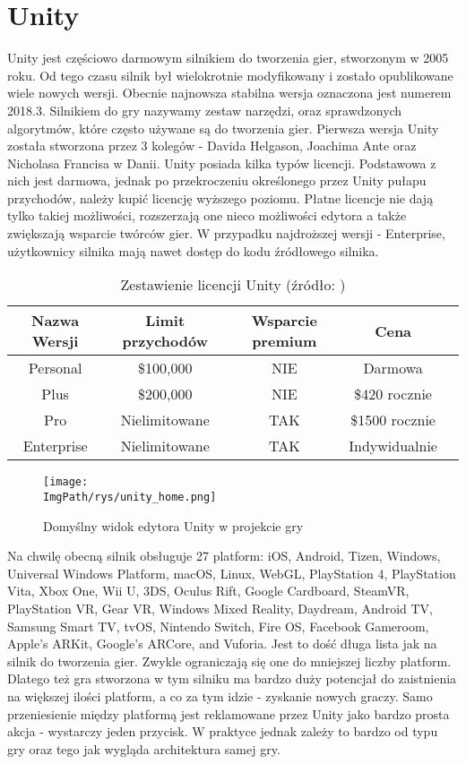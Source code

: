 \documentclass[a4paper,12pt,twoside,openany]{report}
\newcommand{\ImgPath}{.}
\begin{document}
\section{Unity}
Unity jest częściowo darmowym silnikiem do tworzenia gier, stworzonym w 2005 roku. Od tego czasu silnik był wielokrotnie modyfikowany i zostało opublikowane wiele nowych wersji. Obecnie najnowsza stabilna wersja oznaczona jest numerem 2018.3\cite{unity_wiki}. Silnikiem do gry nazywamy zestaw narzędzi, oraz sprawdzonych algorytmów, które często używane są do tworzenia gier. Pierwsza wersja Unity została stworzona przez 3 kolegów - Davida Helgason, Joachima Ante oraz Nicholasa Francisa w Danii. Unity posiada kilka typów licencji. Podstawowa z nich jest darmowa, jednak po przekroczeniu określonego przez Unity pułapu przychodów, należy kupić licencję wyższego poziomu. Płatne licencje nie dają tylko takiej możliwości, rozszerzają one nieco możliwości edytora a także zwiększają wsparcie twórców gier. W przypadku najdroższej wersji - Enterprise, użytkownicy silnika mają nawet dostęp do kodu źródłowego silnika.

\begin{table}[h!]
\centering
\begin{tabular}{c|cccc}
Nazwa Wersji & Limit przychodów & Wsparcie premium & Cena \\ \hline
Personal & \$100,000 & NIE & Darmowa \\
Plus & \$200,000 & NIE & \$420 rocznie \\
Pro & Nielimitowane & TAK & \$1500 rocznie \\
Enterprise & Nielimitowane & TAK & Indywidualnie \\
\end{tabular}
\caption{Zestawienie licencji Unity (źródło: \cite{unity_wiki})}
\label{table_unity_versions}
\end{table}

\begin{figure}[!htbp]
	\begin{center}
\centering
\texttt{[image: \\ImgPath/rys/unity\_home.png]}
\end{center}
	\caption{Domyślny widok edytora Unity w projekcie gry}
	\label{unity_home}
\end{figure}

Na chwilę obecną silnik obsługuje 27 platform: iOS, Android, Tizen, Windows, Universal Windows Platform, macOS, Linux, WebGL, PlayStation 4, PlayStation Vita, Xbox One, Wii U, 3DS, Oculus Rift, Google Cardboard, SteamVR, PlayStation VR, Gear VR, Windows Mixed Reality, Daydream, Android TV, Samsung Smart TV, tvOS, Nintendo Switch, Fire OS, Facebook Gameroom, Apple's ARKit, Google's ARCore, and Vuforia. Jest to dość długa lista jak na silnik do tworzenia gier. Zwykle ograniczają się one do mniejszej liczby platform. Dlatego też gra stworzona w tym silniku ma bardzo duży potencjał do zaistnienia na większej ilości platform, a co za tym idzie - zyskanie nowych graczy. Samo przeniesienie między platformą jest reklamowane przez Unity jako bardzo prosta akcja - wystarczy jeden przycisk. W praktyce jednak zależy to bardzo od typu gry oraz tego jak wygląda architektura samej gry.
\end{document}
